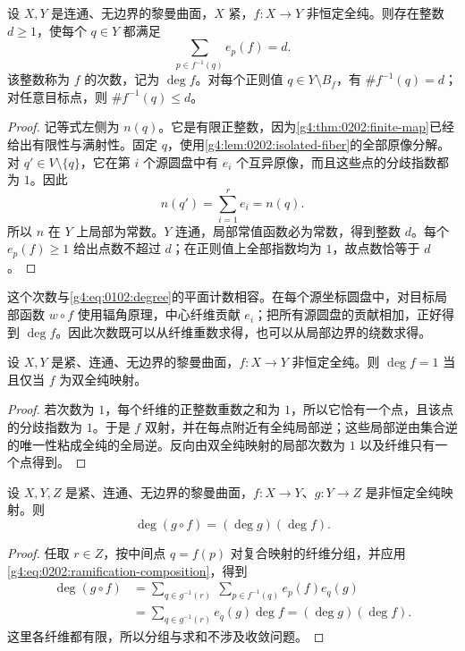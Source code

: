 \begin{theorem}\label{g4:thm:0202:degree}
	设 \(X,Y\) 是连通、无边界的黎曼曲面，\(X\) 紧，\(f:X\rightarrow Y\) 非恒定全纯。则存在整数 \(d\geq1\)，使每个 \(q\in Y\) 都满足
	\begin{equation}\label{g4:eq:0202:fiber-degree}
		\sum_{p\in f^{-1}(q)}e_p(f)=d.
	\end{equation}
	该整数称为 \(f\) 的次数，记为 \(\deg f\)。对每个正则值 \(q\in Y\setminus B_f\)，有 \(\#f^{-1}(q)=d\)；对任意目标点，则 \(\#f^{-1}(q)\leq d\)。
\end{theorem}
\begin{proof}
	记等式左侧为 \(n(q)\)。它是有限正整数，因为\cref{g4:thm:0202:finite-map}已经给出有限性与满射性。固定 \(q\)，使用\cref{g4:lem:0202:isolated-fiber}的全部原像分解。对 \(q'\in V\setminus\{q\}\)，它在第 \(i\) 个源圆盘中有 \(e_i\) 个互异原像，而且这些点的分歧指数都为 \(1\)。因此
	\[
		n(q')=\sum_{i=1}^r e_i=n(q).
	\]
	所以 \(n\) 在 \(Y\) 上局部为常数。\(Y\) 连通，局部常值函数必为常数，得到整数 \(d\)。每个 \(e_p(f)\geq1\) 给出点数不超过 \(d\)；在正则值上全部指数均为 \(1\)，故点数恰等于 \(d\)。
\end{proof}

这个次数与\eqref{g4:eq:0102:degree}的平面计数相容。在每个源坐标圆盘中，对目标局部函数 \(w\circ f\) 使用辐角原理，中心纤维贡献 \(e_i\)；把所有源圆盘的贡献相加，正好得到 \(\deg f\)。因此次数既可以从纤维重数求得，也可以从局部边界的绕数求得。

\begin{corollary}\label{g4:cor:0202:degree-one}
	设 \(X,Y\) 是紧、连通、无边界的黎曼曲面，\(f:X\rightarrow Y\) 非恒定全纯。则 \(\deg f=1\) 当且仅当 \(f\) 为双全纯映射。
\end{corollary}
\begin{proof}
	若次数为 \(1\)，每个纤维的正整数重数之和为 \(1\)，所以它恰有一个点，且该点的分歧指数为 \(1\)。于是 \(f\) 双射，并在每点附近有全纯局部逆；这些局部逆由集合逆的唯一性粘成全纯的全局逆。反向由双全纯映射的局部次数为 \(1\) 以及纤维只有一个点得到。
\end{proof}

\begin{proposition}\label{g4:prop:0202:degree-composition}
	设 \(X,Y,Z\) 是紧、连通、无边界的黎曼曲面，\(f:X\rightarrow Y\)、\(g:Y\rightarrow Z\) 是非恒定全纯映射。则
	\[
		\deg(g\circ f)=(\deg g)(\deg f).
	\]
\end{proposition}
\begin{proof}
	任取 \(r\in Z\)，按中间点 \(q=f(p)\) 对复合映射的纤维分组，并应用\eqref{g4:eq:0202:ramification-composition}，得到
	\begin{align*}
		\deg(g\circ f)
		&=\sum_{q\in g^{-1}(r)}\ \sum_{p\in f^{-1}(q)}e_p(f)e_q(g)\\
		&=\sum_{q\in g^{-1}(r)}e_q(g)\deg f
		=(\deg g)(\deg f).
	\end{align*}
	这里各纤维都有限，所以分组与求和不涉及收敛问题。
\end{proof}

